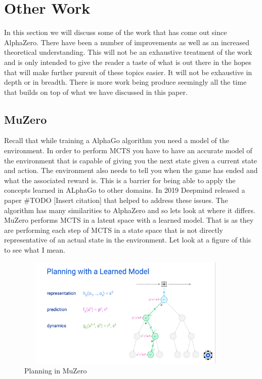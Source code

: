 \section{Other Work}

In this section we will discuss some of the work that has come out since AlphaZero. There have been a number of improvements as well as an increased theoretical understanding. This will not be an exhaustive treatment of the work and is only intended to give the reader a taste of what is out there in the hopes that will make further pursuit of these topics easier. It will not be exhaustive in depth or in breadth. There is more work being produce seemingly all the time that builds on top of what we have discussed in this paper. 

\subsection{MuZero}

Recall that while training a AlphaGo algorithm you need a model of the environment. In order to perform MCTS you have to have an accurate model of the environment that is capable of giving you the next state given a current state and action. The environment also needs to tell you when the game has ended and what the associated reward is. This is a barrier for being able to apply the concepts learned in ALphaGo to other domains. In 2019 Deepmind released a paper #TODO [Insert citation] that helped to address these issues. The algorithm has many similarities to AlphaZero and so lets look at where it differs. MuZero performs MCTS in a latent space with a learned model. That is as they are performing each step of MCTS in a state space that is not directly representative of an actual state in the environment. Let look at a figure of this to see what I mean. 

\begin{figure}[H]
       \centering
       \includegraphics[width=400px,height=200px]{images/muzero_learned_model.png}
       \caption{Planning in MuZero}
       \label{fig:my_label}
\end{figure}


